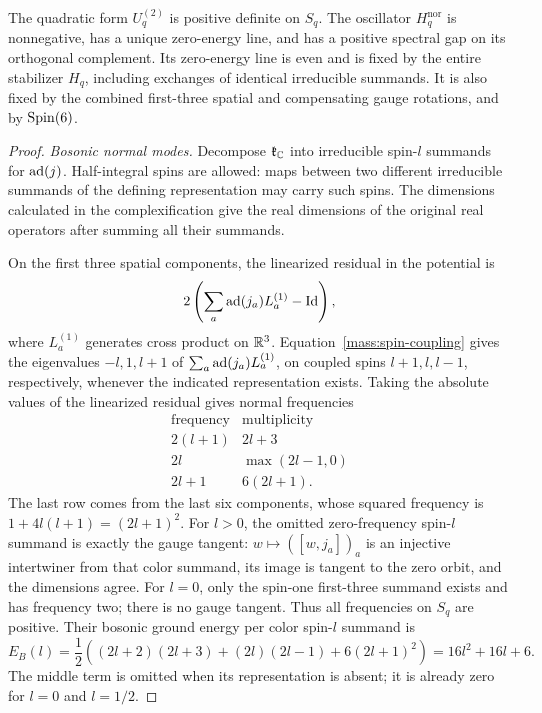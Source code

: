 \begin{lemma}
\label{lem:normal-oscillators}
The quadratic form \(U_q^{(2)}\) is positive definite on \(S_q\).
The oscillator \(H_q^{\mathrm{nor}}\) is nonnegative, has a unique
zero-energy line, and has a positive spectral gap on its orthogonal
complement. Its zero-energy line is even and is fixed by the entire
stabilizer \(H_q\), including exchanges of identical irreducible
summands. It is also fixed by the combined first-three spatial and
compensating gauge rotations, and by \(\operatorname{Spin}(6)\).
\end{lemma}

\begin{proof}
\emph{Bosonic normal modes.}
Decompose \(\mathfrak k_\mathbb C\) into irreducible spin-\(l\) summands
for \(\operatorname{ad}(j)\). Half-integral spins are allowed: maps between two
different irreducible summands of the defining representation may
carry such spins. The dimensions calculated in the complexification
give the real dimensions of the original real operators after
summing all their summands.

On the first three spatial components, the linearized residual in
the potential is
\[
 2\left(\sum_a\operatorname{ad}(j_a)L_a^{(1)}-\mathrm{Id}\right),
\]
where \(L_a^{(1)}\) generates cross product on \(\mathbb R^3\).
Equation~\eqref{mass:spin-coupling} gives the eigenvalues
\(-l,1,l+1\) of \(\sum_a\operatorname{ad}(j_a)L_a^{(1)}\), on coupled spins
\(l+1,l,l-1\), respectively, whenever the indicated representation
exists. Taking the absolute values of the linearized residual gives
normal frequencies
\begin{equation}
\label{mass:boson-frequencies}
 \begin{array}{c|c}
  \text{frequency}&\text{multiplicity}\\ \hline
  2(l+1)&2l+3\\
  2l&\max(2l-1,0)\\
  2l+1&6(2l+1).
 \end{array}
\end{equation}
The last row comes from the last six components, whose squared
frequency is \(1+4l(l+1)=(2l+1)^2\). For \(l>0\), the omitted
zero-frequency spin-\(l\) summand is exactly the gauge tangent:
\(w\mapsto([w,j_a])_a\) is an injective intertwiner from that
color summand, its image is tangent to the zero orbit, and the
dimensions agree. For \(l=0\), only the spin-one first-three
summand exists and has frequency two; there is no gauge tangent.
Thus all frequencies on \(S_q\) are positive. Their bosonic ground
energy per color spin-\(l\) summand is
\begin{equation}
\label{mass:boson-energy}
 E_B(l)=\frac12\left((2l+2)(2l+3)
              +(2l)(2l-1)+6(2l+1)^2\right)
        =16l^2+16l+6.
\end{equation}
The middle term is omitted when its representation is absent; it
is already zero for \(l=0\) and \(l=1/2\).


\end{proof}
